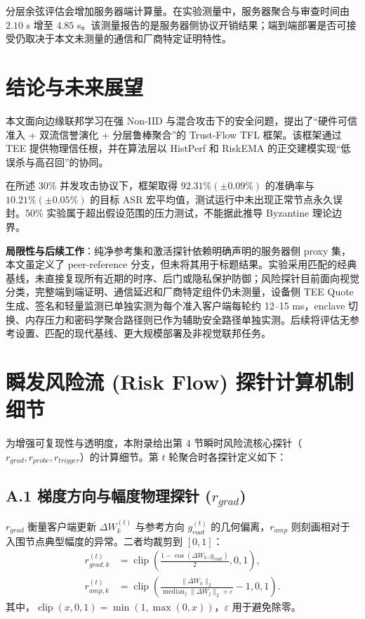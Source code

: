 \documentclass[11pt, a4paper, UTF8, fontset=fandol]{ctexart}
\begin{document}
分层余弦评估会增加服务器端计算量。在实验测量中，服务器聚合与审查时间由 $2.10$ s 增至 $4.85$ s。该测量报告的是服务器侧协议开销结果；端到端部署是否可接受仍取决于本文未测量的通信和厂商特定证明特性。

\section{结论与未来展望}
本文面向边缘联邦学习在强 Non-IID 与混合攻击下的安全问题，提出了“硬件可信准入 + 双流信誉演化 + 分层鲁棒聚合”的 Trust-Flow TFL 框架。该框架通过 TEE 提供物理信任根，并在算法层以 HistPerf 和 RiskEMA 的正交建模实现“低误杀与高召回”的协同。

在所述 30\% 并发攻击协议下，框架取得 $92.31\% (\pm 0.09\%)$ 的准确率与 $10.21\% (\pm 0.05\%)$ 的目标 ASR 宏平均值，测试运行中未出现正常节点永久误封。50\% 实验属于超出假设范围的压力测试，不能据此推导 Byzantine 理论边界。

\textbf{局限性与后续工作}：纯净参考集和激活探针依赖明确声明的服务器侧 proxy 集，本文虽定义了 peer-reference 分支，但未将其用于标题结果。实验采用匹配的经典基线，未直接复现所有近期的时序、后门或隐私保护防御；风险探针目前面向视觉分类，完整端到端证明、通信延迟和厂商特定组件仍未测量，设备侧 TEE Quote 生成、签名和轻量监测已单独实测为每个准入客户端每轮约 12--15 ms，enclave 切换、内存压力和密码学聚合路径则已作为辅助安全路径单独实测。后续将评估无参考设置、匹配的现代基线、更大规模部署及非视觉联邦任务。

\appendix
\section{瞬发风险流 (Risk Flow) 探针计算机制细节}
为增强可复现性与透明度，本附录给出第 4 节瞬时风险流核心探针（$r_{grad}, r_{probe}, r_{trigger}$）的计算细节。第 $t$ 轮聚合时各探针定义如下：

\subsection{A.1 梯度方向与幅度物理探针 ($r_{grad}$)}
$r_{grad}$ 衡量客户端更新 $\Delta W_k^{(t)}$ 与参考方向 $g_{root}^{(t)}$ 的几何偏离，$r_{amp}$ 则刻画相对于入围节点典型幅度的异常。二者均裁剪到 $[0,1]$：
\begin{align}
 r_{grad,k}^{(t)}&=\operatorname{clip}\!\left(
 \frac{1-\cos(\Delta W_k,g_{root})}{2},0,1\right),\\
 r_{amp,k}^{(t)}&=\operatorname{clip}\!\left(
 \frac{\|\Delta W_k\|_2}{\operatorname{median}_j\|\Delta W_j\|_2+\varepsilon}-1,0,1\right).
\end{align}
其中，$\operatorname{clip}(x,0,1)=\min(1,\max(0,x))$，$\varepsilon$ 用于避免除零。
\end{document}
